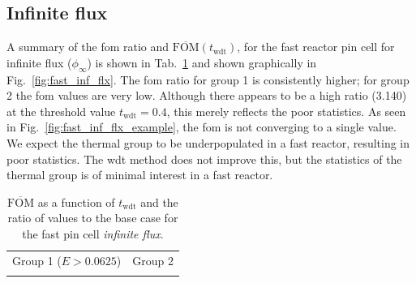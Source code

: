 \subsection{Infinite flux}
\label{sec:fast_inf_flx}
A summary of the \gls{fom} ratio and
$\overline{\mathrm{FOM}}(t_{\mathrm{wdt}})$, for the fast reactor pin
cell for infinite flux ($\phi_{\infty}$) is shown in Tab.~\ref{tab:fast_inf_flx} and
shown graphically in Fig.~\ref{fig:fast_inf_flx}. The \gls{fom} ratio
for group 1 is consistently higher; for group 2 the \gls{fom} values are
very low.
Although there appears to
be a high ratio (3.140) at the threshold value $t_{\mathrm{wdt}}
=0.4$, this merely reflects the poor statistics. As seen in
Fig.~\ref{fig:fast_inf_flx_example}, the \gls{fom} is not converging
to a single value. We expect the thermal group to be underpopulated in
a fast reactor, resulting in poor statistics. The \gls{wdt} method
does not improve this, but the statistics of the thermal group is of
minimal interest in a fast reactor. 
\begin{table}[hbtp]
  \centering
  \caption[$\overline{\mathrm{FOM}}$ and ratio for
    the fast pin cell \textit{infinite flux}.]{$\overline{\mathrm{FOM}}$ as a function of
    $t_{\mathrm{wdt}}$ and the ratio of values to the base case for
    the fast pin cell \textit{infinite flux}.}
  \begin{tabular}{cc} Group 1 ($E > 0.0625$) & Group 2 \\
    
 &
   
  \end{tabular}
\label{tab:fast_inf_flx}
\end{table}
